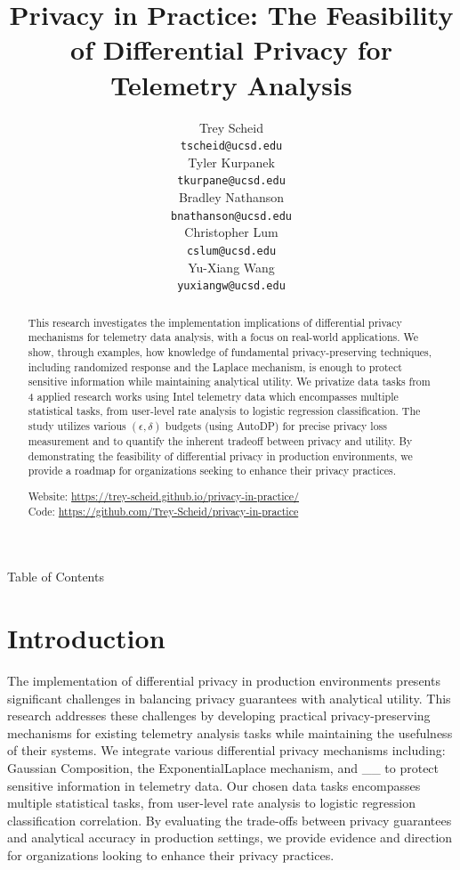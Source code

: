 \documentclass[12pt,letterpaper]{article}
\title{Privacy in Practice: The Feasibility of Differential Privacy for Telemetry Analysis}
\author{Trey Scheid \\
  {\tt tscheid@ucsd.edu} \\\And
  Tyler Kurpanek \\
  {\tt tkurpane@ucsd.edu} \\\And
  Bradley Nathanson \\
  {\tt bnathanson@ucsd.edu} \\\And
  Christopher Lum \\
  {\tt cslum@ucsd.edu} \\\And
  Yu-Xiang Wang \\
  {\tt yuxiangw@ucsd.edu} \\}
\begin{document}
\maketitle




\begin{abstract}    
  This research investigates the implementation implications of differential privacy mechanisms for telemetry data analysis, with a focus on real-world applications. We show, through examples, how knowledge of fundamental privacy-preserving techniques, including randomized response and the Laplace mechanism, is enough to protect sensitive information while maintaining analytical utility. We privatize data tasks from 4 applied research works using Intel telemetry data which   encompasses multiple statistical tasks, from user-level rate analysis to logistic regression classification. The study utilizes various $(\epsilon, \delta)$ budgets (using AutoDP) for precise privacy loss measurement and to quantify the inherent tradeoff between privacy and utility. By demonstrating the feasibility of differential privacy in production environments, we provide a roadmap for organizations seeking to enhance their privacy practices.
  \begin{center}
    Website: \url{https://trey-scheid.github.io/privacy-in-practice/} \\
    Code: \url{https://github.com/Trey-Scheid/privacy-in-practice}
  \end{center}
\end{abstract}

\clearpage

{\Large\bf\raggedright Table of Contents}

\maketoc

\clearpage


\section{Introduction}

The implementation of differential privacy in production environments presents significant challenges in balancing privacy guarantees with analytical utility. This research addresses these challenges by developing practical privacy-preserving mechanisms for existing telemetry analysis tasks while maintaining the usefulness of their systems. We integrate various differential privacy mechanisms including: Gaussian Composition, the Exponential\/Laplace mechanism, and \_\_ to protect sensitive information in telemetry data. Our chosen data tasks encompasses multiple statistical tasks, from user-level rate analysis to logistic regression classification correlation. By evaluating the trade-offs between privacy guarantees and analytical accuracy in production settings, we provide evidence and direction for organizations looking to enhance their privacy practices.
\end{document}
